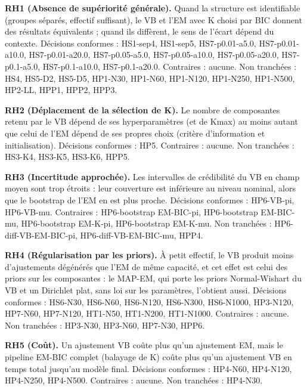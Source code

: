 \textbf{RH1 (Absence de supériorité générale).} Quand la structure est identifiable (groupes séparés, effectif suffisant), le VB et l'EM avec K choisi par BIC donnent des résultats équivalents ; quand ils diffèrent, le sens de l'écart dépend du contexte. Décisions conformes : HS1-sep4, HS1-sep5, HS7-p0.01-a5.0, HS7-p0.01-a10.0, HS7-p0.01-a20.0, HS7-p0.05-a5.0, HS7-p0.05-a10.0, HS7-p0.05-a20.0, HS7-p0.1-a5.0, HS7-p0.1-a10.0, HS7-p0.1-a20.0. Contraires : aucune. Non tranchées : HS4, HS5-D2, HS5-D5, HP1-N30, HP1-N60, HP1-N120, HP1-N250, HP1-N500, HP2-LL, HPP1, HPP2, HPP3.

\textbf{RH2 (Déplacement de la sélection de K).} Le nombre de composantes retenu par le VB dépend de ses hyperparamètres (et de Kmax) au moins autant que celui de l'EM dépend de ses propres choix (critère d'information et initialisation). Décisions conformes : HP5. Contraires : aucune. Non tranchées : HS3-K4, HS3-K5, HS3-K6, HPP5.

\textbf{RH3 (Incertitude approchée).} Les intervalles de crédibilité du VB en champ moyen sont trop étroits : leur couverture est inférieure au niveau nominal, alors que le bootstrap de l'EM en est plus proche. Décisions conformes : HP6-VB-pi, HP6-VB-mu. Contraires : HP6-bootstrap EM-BIC-pi, HP6-bootstrap EM-BIC-mu, HP6-bootstrap EM-K-pi, HP6-bootstrap EM-K-mu. Non tranchées : HP6-diff-VB-EM-BIC-pi, HP6-diff-VB-EM-BIC-mu, HPP4.

\textbf{RH4 (Régularisation par les priors).} À petit effectif, le VB produit moins d'ajustements dégénérés que l'EM de même capacité, et cet effet est celui des priors sur les composantes : le MAP-EM, qui porte les priors Normal-Wishart du VB et un Dirichlet plat, sans loi sur les paramètres, l'obtient aussi. Décisions conformes : HS6-N30, HS6-N60, HS6-N120, HS6-N300, HS6-N1000, HP3-N120, HP7-N60, HP7-N120, HT1-N50, HT1-N200, HT1-N1000. Contraires : aucune. Non tranchées : HP3-N30, HP3-N60, HP7-N30, HPP6.

\textbf{RH5 (Coût).} Un ajustement VB coûte plus qu'un ajustement EM, mais le pipeline EM-BIC complet (balayage de K) coûte plus qu'un ajustement VB en temps total jusqu'au modèle final. Décisions conformes : HP4-N60, HP4-N120, HP4-N250, HP4-N500. Contraires : aucune. Non tranchées : HP4-N30.
